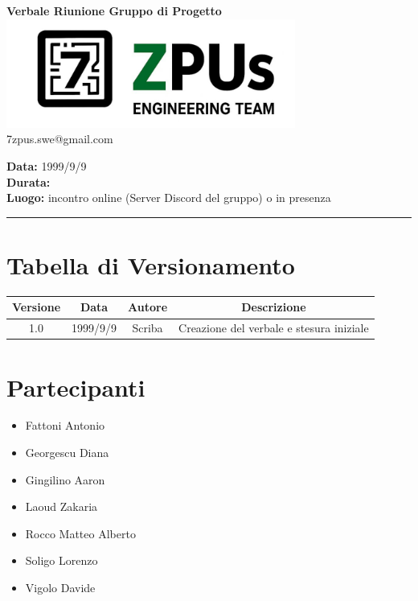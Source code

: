 \documentclass[a4paper,12pt]{article}
\begin{document}
\begin{center}
    \Large \textbf{Verbale Riunione Gruppo di Progetto}\\
    \vspace{0.5cm}
    \includegraphics[width=9.5cm]{../../images/logo7ZPUs2.jpg}\\
    \small\hspace{10cm} 7zpus.swe@gmail.com
\end{center}

\noindent
\textbf{Data:} 1999/9/9 \\
\textbf{Durata:}  \\
\textbf{Luogo:} incontro online (Server Discord del gruppo) o in presenza

\vspace{0.3cm}
\hrule
\vspace{0.5cm}

\tableofcontents

\newpage

\section{Tabella di Versionamento}
    \begin{tabular}{|c|c|c|c|}
        \hline
        \textbf{Versione} & \textbf{Data} & \textbf{Autore} & \textbf{Descrizione} \\
        \hline
        1.0 & 1999/9/9 & Scriba & Creazione del verbale e stesura iniziale \\

        \hline
    \end{tabular}


\section{Partecipanti}
\begin{itemize}[noitemsep]
    \item Fattoni Antonio 
    \item Georgescu Diana
    \item Gingilino Aaron
    \item Laoud Zakaria
    \item Rocco Matteo Alberto
    \item Soligo Lorenzo
    \item Vigolo Davide
\end{itemize}
\end{document}
